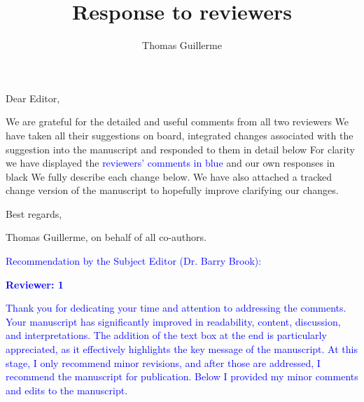 \documentclass[
]{article}
\title{Response to reviewers}
\author{Thomas Guillerme}
\begin{document}
\maketitle


Dear Editor,

We are grateful for the detailed and useful comments from all two reviewers
We have taken all their suggestions on board, integrated changes associated with the suggestion into the manuscript and responded to them in detail below
For clarity we have displayed the \textcolor{blue}{reviewers' comments in blue} and our own responses in black
We fully describe each change below.
We have also attached a tracked change version of the manuscript to hopefully improve clarifying our changes.

Best regards,

Thomas Guillerme, on behalf of all co-authors.

\textcolor{blue}{Recommendation by the Subject Editor (Dr. Barry Brook):}






\textcolor{blue}{\textbf{Reviewer: 1}}

\textcolor{blue}{Thank you for dedicating your time and attention to addressing the comments. Your manuscript has significantly improved in readability, content, discussion, and interpretations. The addition of the text box at the end is particularly appreciated, as it effectively highlights the key message of the manuscript. At this stage, I only recommend minor revisions, and after those are addressed, I recommend the manuscript for publication. Below I provided my minor comments and edits to the manuscript.}
\end{document}
